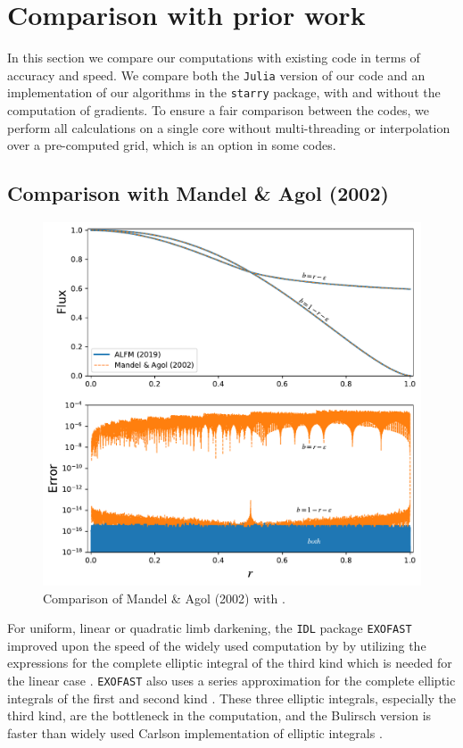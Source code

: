 \documentclass[modern,trackchanges]{aastex63}
\begin{document}
\section{Comparison with prior work} \label{sec:comparison}

In this section we compare our computations with existing code in terms
of accuracy and speed. We compare both the \texttt{Julia} version
of our code and an implementation of our algorithms
in the \texttt{starry} package, with and without the computation
of gradients. To ensure a fair comparison between the codes, we
perform all calculations on a single core without multi-threading
or interpolation over a pre-computed grid, which is an option
in some codes.

\subsection{Comparison with Mandel \& Agol (2002)}

\begin{figure}[t!]
    \begin{centering}
    \includegraphics[width=0.9\linewidth]{figures/julia/compare_MA2002.pdf}
    \caption{Comparison of Mandel \& Agol (2002) with \thiswork.
    \label{fig:compareMA}}
    \end{centering}
\end{figure}

For uniform, linear or quadratic limb darkening, the \texttt{IDL} package \texttt{EXOFAST} 
improved upon the speed of the widely used computation by \citet{MandelAgol2002} 
by utilizing the \citet{Bulirsch1965a,Bulirsch1965b} expressions for the complete 
elliptic integral of the third kind which is needed for the linear case
\citep{Eastman2013}.  \texttt{EXOFAST} also uses a series
approximation for the complete elliptic integrals of the first and second
kind \citep{Hastings1955}. These three elliptic integrals, especially the third
kind, are the bottleneck in the computation, and the Bulirsch version is faster
than widely used Carlson implementation of elliptic integrals \citep{Carlson1979}.
\end{document}
